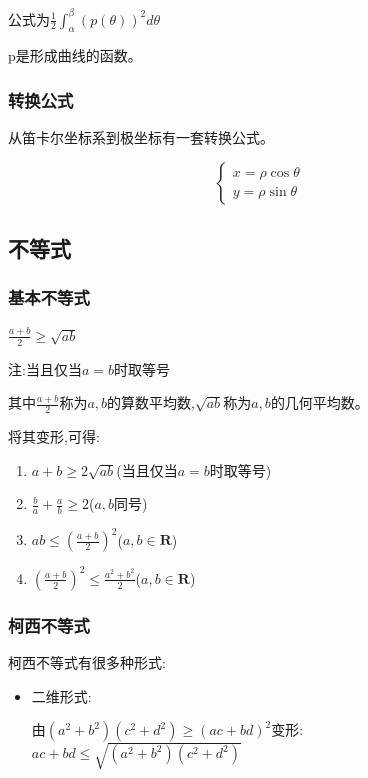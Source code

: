 \documentclass[UTF8]{ctexbook}
\newcommand{\definiteIntegral}[2]{\int^{#1}_{#2}}
\newcommand{\mathRealNumberCollection}{\mathbf{R}}
\begin{document}
{{{{  公式为$\frac{1}{2}\definiteIntegral{\beta}{\alpha}(p(\theta))^2d\theta$

  p是形成曲线的函数。
  }%

  \subsubsection{转换公式}{
    从笛卡尔坐标系到极坐标有一套转换公式。

    $$
      \begin{cases}
        x = \rho\cos\theta \\
        y = \rho\sin\theta
      \end{cases}
    $$
  }%

}%

\subsection{不等式}{

\subsubsection{基本不等式}{
  $\frac{a + b}{2} \geq \sqrt{ab}$

  注:当且仅当$a = b$时取等号

  其中$\frac{a+b}{2}$称为$a,b$的算数平均数,$\sqrt{ab}$称为$a,b$的几何平均数。

  将其变形,可得:
  \begin{enumerate}
    \item $a + b \geq 2\sqrt{ab}$(当且仅当$a = b$时取等号)
    \item $\frac{b}{a} + \frac{a}{b} \geq 2$($a,b$同号)
    \item $ab \leq (\frac{a + b}{2})^2$($a,b\in\mathRealNumberCollection$)
    \item $(\frac{a + b}{2})^2 \leq \frac{a^2 + b^2}{2}$($a,b\in\mathRealNumberCollection$)
  \end{enumerate}
}%


\subsubsection{柯西不等式}{
  柯西不等式有很多种形式:
  \begin{itemize}
    \item {
          二维形式:

          由$(a^2 + b^2)(c^2 + d^2)\geq(ac + bd)^2$变形:$ac + bd \leq \sqrt{(a^2 + b^2)(c^2 + d^2)}$

}
\end{itemize}}}}}
\end{document}
